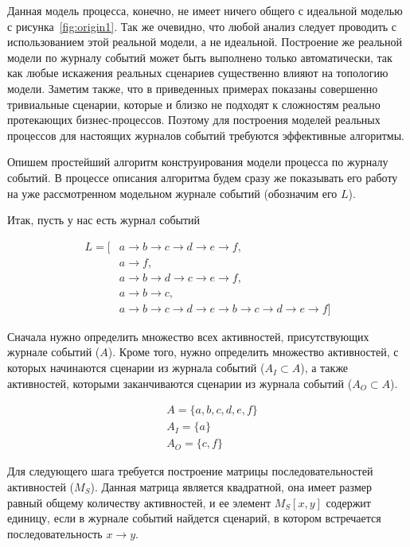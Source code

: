 \documentclass[
11pt,%
tightenlines,%
twoside,%
onecolumn,%
nofloats,%
nobibnotes,%
nofootinbib,%
superscriptaddress,%
noshowpacs,%
centertags]%
{revtex4}
\begin{document}
Данная модель процесса, конечно, не имеет ничего общего с идеальной моделью с рисунка~\ref{fig:origin1}.
Так же очевидно, что любой анализ следует проводить с использованием этой реальной модели, а не идеальной.
Построение же реальной модели по журналу событий может быть выполнено только автоматически, так как любые искажения реальных сценариев существенно влияют на топологию модели.
Заметим также, что в приведенных примерах показаны совершенно тривиальные сценарии, которые и близко не подходят к сложностям реально протекающих бизнес-процессов.
Поэтому для построения моделей реальных процессов для настоящих журналов событий требуются эффективные алгоритмы.

Опишем простейший алгоритм конструирования модели процесса по журналу событий.
В процессе описания алгоритма будем сразу же показывать его работу на уже рассмотренном модельном журнале событий (обозначим его $L$).

Итак, пусть у нас есть журнал событий

\begin{equation}
\begin{aligned}
L = [
&{a \rightarrow b \rightarrow c \rightarrow d \rightarrow e \rightarrow f},\\
&{a \rightarrow f},\\
&{a \rightarrow b \rightarrow d \rightarrow c \rightarrow e \rightarrow f},\\
&{a \rightarrow b \rightarrow c},\\
&{a \rightarrow b \rightarrow c \rightarrow d \rightarrow e \rightarrow b \rightarrow c \rightarrow d \rightarrow e \rightarrow f}
]
\end{aligned}
\end{equation}

Сначала нужно определить множество всех активностей, присутствующих журнале событий ($A$).
Кроме того, нужно определить множество активностей, с которых начинаются сценарии из журнала событий ($A_I \subset A$), а также активностей, которыми заканчиваются сценарии из журнала событий ($A_O \subset A$).

\begin{equation}
\begin{aligned}
&A = \{a, b, c, d, e, f\} \\
&A_I = \{a\} \\
&A_O = \{c, f\}
\end{aligned}
\end{equation}

Для следующего шага требуется построение матрицы последовательностей активностей ($M_S$).
Данная матрица является квадратной, она имеет размер равный общему количеству активностей, и ее элемент $M_S[x, y]$ содержит единицу, если в журнале событий найдется сценарий, в котором встречается последовательность $x \rightarrow y$.
\end{document}
